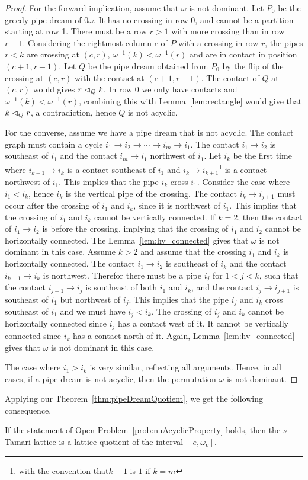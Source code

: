 \begin{proof} For the forward implication, assume that $\omega$ is not dominant. 
Let $P_0$ be the greedy pipe dream of $0\omega$. It has no crossing in row 0, and cannot be a partition starting at row 1.
There must be a row $r>1$ with more crossing than in row $r-1$. 
Considering the rightmost column $c$ of $P$ with a crossing in row $r$,  the pipes $r<k$ are crossing at $(c,r)$, $\omega^{-1}(k)<\omega^{-1}(r)$ and are in contact in position $(c+1,r-1)$.
Let $Q$ be the pipe dream obtained from $P_0$ by the flip of the crossing at $(c,r)$ with the contact at $(c+1,r-1)$.
The contact of $Q$ at $(c,r)$ would gives $r\vartriangleleft_{Q} k$. In row $0$ we only have contacts and $\omega^{-1}(k)<\omega^{-1}(r)$, combining this  with Lemma~\ref{lem:rectangle} would give  that 
$k \vartriangleleft_{Q} r$, a contradiction, hence $Q$ is not acyclic.

For the converse, assume we have a pipe dream that is not acyclic. The contact graph must contain a cycle $i_1 \to i_2\to\cdots\to i_m\to i_1$.
The contact $i_1 \to i_2$ is southeast of $i_1$ and the contact  $i_m\to i_1$ northwest of $i_1$. 
Let $i_k$ be the first time where $i_{k-1}\to i_k$ is a contact southeast of $i_1$ and $i_k \to i_{k+1}$\footnote{with the convention that$k+1$ is $1$ if $k=m$} is a contact northwest of $i_1$.
This implies that the pipe $i_k$ cross $i_1$. Consider the case where $i_1<i_k$, hence $i_k$ is the vertical pipe of the crossing. 
The contact $i_k\to i_{j+1}$ must occur after the crossing of $i_1$ and $i_k$, since it is northwest of $i_1$.
This implies that the crossing of $i_1$ and $i_k$ cannot be vertically connected. 
If $k=2$, then the contact of $i_1\to i_2$ is before the crossing, implying that the crossing of $i_1$ and $i_2$ cannot be horizontally connected. 
The Lemma~\ref{lem:hv_connected} gives that $\omega$ is not dominant in this case.
Assume $k>2$ and assume that the crossing $i_1$ and $i_k$ is horizontally connected. The contact $i_1\to i_2$ is southeast of $i_k$ and the contact $i_{k-1}\to i_k$ is northwest.
Therefor there must be a pipe $i_j$ for $1<j<k$, such that the contact $i_{j-1}\to i_j$ is southeast of both $i_1$ and $i_k$, and the contact $i_{j}\to i_{j+1}$ is southeast of $i_1$ but northwest of $i_j$.
This implies that the pipe $i_j$ and $i_k$ cross southeast of $i_1$ and we must have $i_j<i_k$. The crossing of $i_j$ and $i_k$ cannot be horizontally connected since $i_j$ has a contact west of it.
It cannot be vertically connected since $i_k$ has a contact north of it. Again, Lemma~\ref{lem:hv_connected} gives that $\omega$ is not dominant in this case.

The case where $i_1>i_k$ is very similar, reflecting all arguments. Hence, in all cases, if a pipe dream is not acyclic, then the permutation $\omega$ is not dominant. 
\end{proof}

Applying our Theorem~\ref{thm:pipeDreamQuotient}, we get the following consequence.

\begin{corollary}
If the statement of Open Problem~\ref{prob:nuAcyclicProperty} holds, then the $\nu$-Tamari lattice is a lattice quotient of the interval~$[e,\omega_\nu]$.
\end{corollary}  
